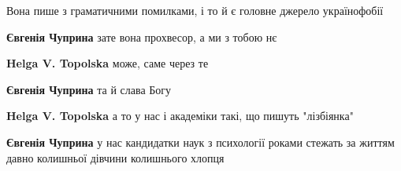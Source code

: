 \begin{itemize}
 
Вона пише з граматичними помилками, і то й є головне джерело українофобії

\begin{itemize}
 
\textbf{Євгенія Чуприна} зате вона прохвесор, а ми з тобою нє

 
\textbf{Helga V. Topolska} може, саме через те

 
\textbf{Євгенія Чуприна} та й слава Богу

 
\textbf{Helga V. Topolska} а то у нас і академіки такі, що пишуть "лізбіянка"

 
\textbf{Євгенія Чуприна} у нас кандидатки наук з психології роками стежать за життям давно колишньої дівчини колишнього хлопця

 

\end{itemize}
\end{itemize}
